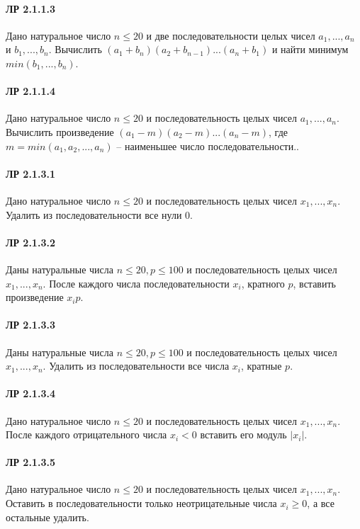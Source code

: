 \documentclass[12pt,a4paper]{report}
\begin{document}
\paragraph*{ЛР 2.1.1.3} Дано натуральное число $n \le 20$ и две последовательности целых чисел $a_1, ..., a_n$ и $b_1, ..., b_n$. Вычислить $(a_1 + b_n)(a_2 + b_{n-1}) ... (a_n + b_1)$ и найти минимум $min(b_1, ..., b_n)$.
\paragraph*{ЛР 2.1.1.4} Дано натуральное число $n \le 20$ и последовательность целых чисел $a_1, ..., a_n$. Вычислить произведение $(a_1 - m)(a_2 - m) ... (a_n - m)$, где $m = min(a_1, a_2, ..., a_n)$ -- наименьшее число последовательности..

\clearpage
\paragraph*{ЛР 2.1.3.1} Дано натуральное число $n \le 20$ и последовательность целых чисел $x_1, ..., x_n$. Удалить из последовательности все нули $0$.
\paragraph*{ЛР 2.1.3.2} Даны натуральные числа $n \le 20, p \le 100$ и последовательность целых чисел $x_1, ..., x_n$. После каждого  числа последовательности $x_i$, кратного $p$, вставить произведение $x_i p$.
\paragraph*{ЛР 2.1.3.3} Даны натуральные числа $n \le 20, p \le 100$ и последовательность целых чисел $x_1, ..., x_n$. Удалить из последовательности все числа $x_i$, кратные $p$.
\paragraph*{ЛР 2.1.3.4} Дано натуральное число $n \le 20$ и последовательность целых чисел $x_1, ..., x_n$. После каждого отрицательного числа $x_i<0$ вставить его модуль $|x_i|$.
\paragraph*{ЛР 2.1.3.5} Дано натуральное число $n \le 20$ и последовательность целых чисел $x_1, ..., x_n$. Оставить в последовательности только неотрицательные числа $x_i \ge 0$, а все остальные удалить.
\end{document}
